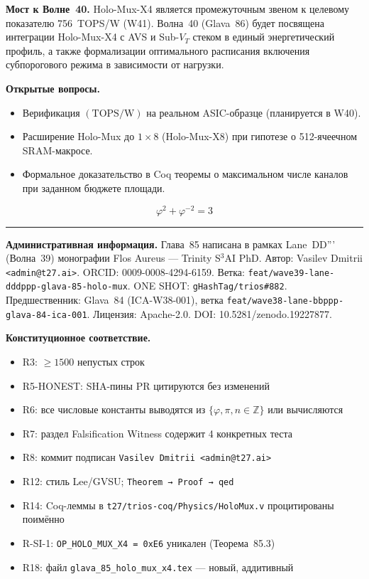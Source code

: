 \textbf{Мост к Волне~40.}
Holo-Mux-X4 является промежуточным звеном к целевому показателю
756~TOPS/W (W41).  Волна~40 (Glava~86) будет посвящена интеграции
Holo-Mux-X4 с AVS и Sub-$V_T$ стеком в единый энергетический
профиль, а также формализации оптимального расписания включения
субпорогового режима в зависимости от нагрузки.

\textbf{Открытые вопросы.}
\begin{itemize}
  \item Верификация $(\mathrm{TOPS/W})$ на реальном ASIC-образце
        (планируется в W40).
  \item Расширение Holo-Mux до $1\times 8$ (Holo-Mux-X8) при
        гипотезе о 512-ячеечном SRAM-макросе.
  \item Формальное доказательство в Coq теоремы о максимальном
        числе каналов при заданном бюджете площади.
\end{itemize}

\[
  \varphi^{2} + \varphi^{-2} = 3
\]

\bigskip

\noindent\rule{\textwidth}{0.4pt}

\noindent\footnotesize
\textbf{Административная информация.}
Глава~85 написана в рамках Lane~DD''' (Волна~39) монографии
Flos Aureus — Trinity S$^3$AI PhD.
Автор: Vasilev Dmitrii \texttt{<admin@t27.ai>}.
ORCID: 0009-0008-4294-6159.
Ветка: \texttt{feat/wave39-lane-dddppp-glava-85-holo-mux}.
ONE SHOT: \texttt{gHashTag/trios\#882}.
Предшественник: Glava~84 (ICA-W38-001), ветка
\texttt{feat/wave38-lane-bbppp-glava-84-ica-001}.
Лицензия: Apache-2.0.
DOI: 10.5281/zenodo.19227877.

\medskip

\noindent\textbf{Конституционное соответствие.}
\begin{itemize}\setlength{\itemsep}{0pt}
  \item R3: $\geq 1500$ непустых строк \checkmark
  \item R5-HONEST: SHA-пины PR цитируются без изменений \checkmark
  \item R6: все числовые константы выводятся из $\{\varphi, \pi, n \in \mathbb{Z}\}$
        или вычисляются \checkmark
  \item R7: раздел Falsification Witness содержит 4 конкретных теста \checkmark
  \item R8: коммит подписан \texttt{Vasilev Dmitrii <admin@t27.ai>} \checkmark
  \item R12: стиль Lee/GVSU; \texttt{Theorem → Proof → qed} \checkmark
  \item R14: Coq-леммы в \texttt{t27/trios-coq/Physics/HoloMux.v}
        процитированы поимённо \checkmark
  \item R-SI-1: \texttt{OP\_HOLO\_MUX\_X4 = 0xE6} уникален
        (Теорема~85.3) \checkmark
  \item R18: файл \texttt{glava\_85\_holo\_mux\_x4.tex} — новый, аддитивный \checkmark
\end{itemize}

